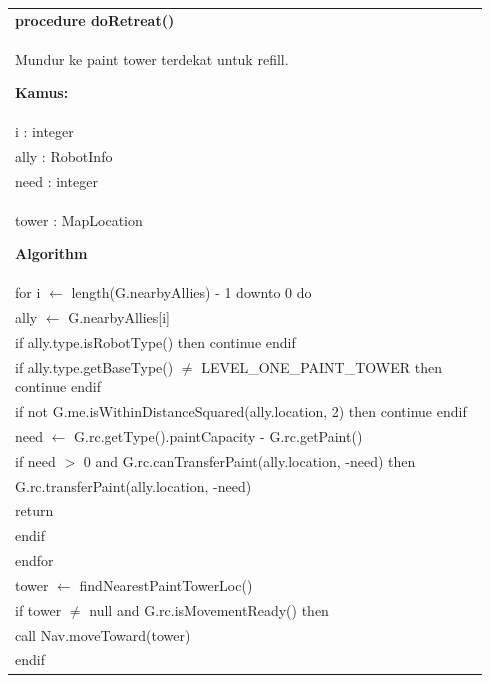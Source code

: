 \documentclass{article}
\newenvironment{pseudobox}
{
\centering
\begin{longtable}{|p{0.94\linewidth}|}
\hline
}
{
\\ \hline
\end{longtable}
\vspace{0.05cm}
}
\begin{document}
\begin{pseudobox}
\textbf{procedure doRetreat()} \\
{ Mundur ke paint tower terdekat untuk refill. }

\textbf{Kamus:} \\
\hspace*{1em} i : integer \\
\hspace*{1em} ally : RobotInfo \\
\hspace*{1em} need : integer \\
\hspace*{1em} tower : MapLocation

\textbf{Algorithm} \\
\hspace*{1em} for i $\leftarrow$ length(G.nearbyAllies) - 1 downto 0 do \\
\hspace*{2em} ally $\leftarrow$ G.nearbyAllies[i] \\
\hspace*{2em} if ally.type.isRobotType() then continue endif \\
\hspace*{2em} if ally.type.getBaseType() $\neq$ LEVEL\_ONE\_PAINT\_TOWER then continue endif \\
\hspace*{2em} if not G.me.isWithinDistanceSquared(ally.location, 2) then continue endif \\

\hspace*{2em} need $\leftarrow$ G.rc.getType().paintCapacity - G.rc.getPaint() \\
\hspace*{2em} if need $>$ 0 and G.rc.canTransferPaint(ally.location, -need) then \\
\hspace*{3em} G.rc.transferPaint(ally.location, -need) \\
\hspace*{3em} return \\
\hspace*{2em} endif \\
\hspace*{1em} endfor \\

\hspace*{1em} tower $\leftarrow$ findNearestPaintTowerLoc() \\
\hspace*{1em} if tower $\neq$ null and G.rc.isMovementReady() then \\
\hspace*{2em} call Nav.moveToward(tower) \\
\hspace*{1em} endif
\end{pseudobox}
\end{document}
